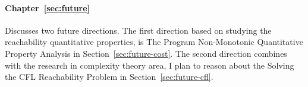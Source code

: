 \begin{enumerate}
    \paragraph*{Chapter~\ref{sec:future}}
    Discusses two future directions.
    The first direction based on studying the reachability quantitative properties,
   is {The Program Non-Monotonic Quantitative Property Analysis} in Section~\ref{sec:future-cost}.
   The second direction combines with the research in complexity theory area, I plan to reason
   about the Solving the CFL Reachability Problem in Section~\ref{sec:future-cfl}.
        

\end{enumerate}

